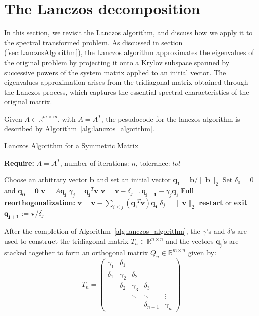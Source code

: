 \section{The Lanczos decomposition}\label{sec:LanczosDecomposition}

In this section, we revisit the Lanczos algorithm, and discuss how we apply it to the spectral transformed problem. As discussed in section (\ref{sec:LanczosAlgorithm}), the Lanczos algorithm approximates the eigenvalues of the original problem by projecting it onto a Krylov subspace spanned by successive powers of the system matrix applied to an initial vector. The eigenvalues approximation arises from the tridiagonal matrix obtained through the Lanczos process, which captures the essential spectral characteristics of the original matrix.

Given $A \in \mathbb{R}^{m \times m}$, with $A=A^T$, the pesudocode for the lanczos algorithm is described by Algorithm~\ref{alg:lanczos_algorithm}.
\begin{algorithm}
	\caption{Lanczos Algorithm for a Symmetric Matrix}
	\label{alg:lanczos_algorithm}

	\textbf{Require:} \( A = A^T \), number of iterations: \(n\), tolerance: \(tol\)
	\begin{algorithmic}[1]
		\State Choose an arbitrary vector $\mathbf{b}$ and set an initial vector $\mathbf{q_1} = \mathbf{b}/ \|\mathbf{b}\|_2$ 
		\State Set $\delta_0 = 0$ and $\mathbf{q_0} = \mathbf{0}$
		\State $\mathbf{v} = A \mathbf{q_j}$
		\State $\gamma_j = \mathbf{q_j}^T \mathbf{v} $
		\State $\mathbf{v} = \mathbf{v} - \delta_{j-1}\mathbf{q_{j-1}} - \gamma_j \mathbf{q_j}$
		\State \textbf{Full reorthogonalization:} $\mathbf{v} = \mathbf{v} - \sum_{i \leq j} (\mathbf{q_i}^T \mathbf{v}) \mathbf{q_i}$
		\State $\delta_{j} = \|\mathbf{v}\|_2$
		\State \textbf{restart} or \textbf{exit}
		\EndIf
		\State $\mathbf{q_{j+1}} := \mathbf{v} / \delta_{j}$
		\EndFor
		\EndFunction
	\end{algorithmic}
\end{algorithm}
After the completion of Algorithm~\ref{alg:lanczos_algorithm}, the $\gamma$'s and $\delta$'s are used to construct the tridiagonal matrix $T_n \in \mathbb{R}^{n \times n}$ and the vectors $\mathbf{q_j}$'s are stacked together to form an orthogonal matrix $Q_n \in \mathbb{R}^{m \times n}$ given by:
\[T_n = \begin{pmatrix}
			\gamma_1 & \delta_1 & & & \\\delta_1 & \gamma_2 & \delta_2 & & \\ & \delta_2 & \gamma_3 & \delta_3 & \\ & & \ddots & \ddots & \vdots \\ & & & \delta_{n-1} & \gamma_n
		\end{pmatrix}\] 
